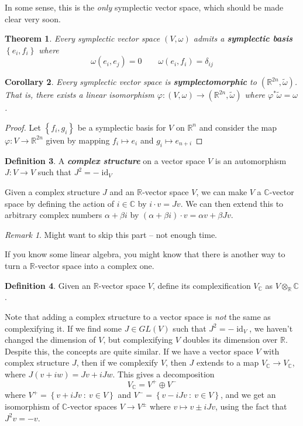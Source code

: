 \documentclass[psamsfonts]{amsart}
\newtheorem{thm}{Theorem}[section]
\newtheorem{cor}[thm]{Corollary}
\theoremstyle{definition}
\newtheorem{defn}[thm]{Definition}
\theoremstyle{remark}
\newtheorem*{rem*}{Remark}
\newcommand{\R}{\mathbb{R}}
\newcommand{\ib}[1]{\textbf{\textit{#1}}}
\newcommand{\C}{\mathbb{C}}
\newcommand{\set}[1]{\left\lbrace #1 \right\rbrace}
\DeclareMathOperator{\id}{id}
\begin{document}
In some sense, this is the \emph{only} symplectic vector space, which should be made clear very soon.
\begin{thm}
Every symplectic vector space $(V,\omega)$ admits a \ib{symplectic basis} $\set{e_i, f_i}$ where
$$\omega(e_i,e_j) = 0 \qquad \omega(e_i,f_i) = \delta_{ij}$$
\end{thm}
%
\begin{cor}
Every symplectic vector space is \ib{symplectomorphic} to $(\R^{2n}, \tilde{\omega})$. That is, there exists a linear isomorphism $\varphi: (V,\omega) \to (\R^{2n},\tilde{\omega})$ where $\varphi^*\tilde{\omega} = \omega$.
\end{cor}
%
\begin{proof}
Let $\set{f_i,g_i}$ be a symplectic basis for $V$ on $\R^n$ and consider the map $\varphi: V \to \R^{2n}$ given by mapping $f_i \mapsto e_i$ and $g_i \mapsto e_{n + i}$
\end{proof}
%
\begin{defn}
A \ib{complex structure} on a vector space $V$ is an automorphism $J: V \to V$ such that $J^2 = -\id_V$
\end{defn}
%
Given a complex structure $J$ and an $\R$-vector space $V$, we can make $V$ a $\C$-vector space by defining the action of $i \in \C$ by $i \cdot v = Jv$. We can then extend this to arbitrary complex numbers $\alpha + \beta i$ by $(\alpha + \beta i)\cdot v = \alpha v + \beta Jv$.

\begin{rem*}
Might want to skip this part -- not enough time.
\end{rem*}
If you know some linear algebra, you might know that there is another way to turn a $\R$-vector space into a complex one. 
\begin{defn}
Given an $\R$-vector space $V$, define its complexification $V_\C$ as $V \otimes_\R \C$.
\end{defn}
Note that adding a complex structure to a vector space is \emph{not} the same as complexifying it. If we find some $J \in GL(V)$ such that $J^2 = -\id_V$, we haven't changed the dimension of $V$, but complexifying $V$ doubles its dimension over $\R$. Despite this, the concepts are quite similar. If we have a vector space $V$ with complex structure $J$, then if we complexify $V$, then $J$ extends to a map $V_\C \to V_\C$, where $J(v + i w) = Jv + iJw$. This gives a decomposition
$$V_\C = V^+ \oplus V^- $$
where $V^+ = \set{v + iJv ~:~v \in V}$ and $V^- = \set{v - iJv ~:~ v \in V}$, and we get an isomorphism of $\C$-vector spaces $V \to V^\pm$ where $v \mapsto v \pm iJv$, using the fact that $J^2v = -v$.
\end{document}
